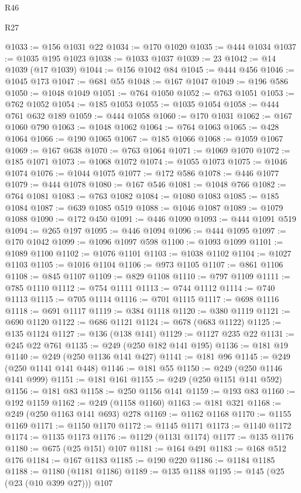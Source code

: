 \begin{lexlean}{R46}
\begin{lexlean}{R27}
\begin{coremodule}
{{{{{{{{{{{{{{{{{{{{{{{{{{{{{{{{{{{{{{{{{{{{{{{{{{{{{{{{{{{{{{@1033 := @156 @1031 @22
@1034 := @170 @1020
@1035 := @444 @1034
@1037 := @1035 @195 @1023
@1038 := @1033 @1037
@1039 := 23
@1042 := @14 @1039 (@17 @1039)
@1044 := @156 @1042 @84
@1045 := @444 @456
@1046 := @1045 @173
@1047 := @681 @55
@1048 := @167 @1047
@1049 := @196 @586
@1050 := @1048 @1049
@1051 := @764 @1050
@1052 := @763 @1051
@1053 := @762 @1052
@1054 := @185 @1053
@1055 := @1035 @1054
@1058 := @444 @761 @632 @189
@1059 := @444 @1058
@1060 := @170 @1031
@1062 := @167 @1060 @790
@1063 := @1048 @1062
@1064 := @764 @1063
@1065 := @428 @1064
@1066 := @190 @1065
@1067 := @185 @1066
@1068 := @1059 @1067
@1069 := @167 @638
@1070 := @763 @1064
@1071 := @1069 @1070
@1072 := @185 @1071
@1073 := @1068 @1072
@1074 := @1055 @1073
@1075 := @1046 @1074
@1076 := @1044 @1075
@1077 := @172 @586
@1078 := @446 @1077
@1079 := @444 @1078
@1080 := @167 @546
@1081 := @1048 @766
@1082 := @764 @1081
@1083 := @763 @1082
@1084 := @1080 @1083
@1085 := @185 @1084
@1087 := @639 @1085 @519
@1088 := @1046 @1087
@1089 := @1079 @1088
@1090 := @172 @450
@1091 := @446 @1090
@1093 := @444 @1091 @519
@1094 := @265 @197
@1095 := @446 @1094
@1096 := @444 @1095
@1097 := @170 @1042
@1099 := @1096 @1097 @598
@1100 := @1093 @1099
@1101 := @1089 @1100
@1102 := @1076 @1101
@1103 := @1038 @1102
@1104 := @1027 @1103
@1105 := @1016 @1104
@1106 := @973 @1105
@1107 := @861 @1106
@1108 := @845 @1107
@1109 := @829 @1108
@1110 := @797 @1109
@1111 := @785 @1110
@1112 := @754 @1111
@1113 := @744 @1112
@1114 := @740 @1113
@1115 := @705 @1114
@1116 := @701 @1115
@1117 := @698 @1116
@1118 := @691 @1117
@1119 := @384 @1118
@1120 := @380 @1119
@1121 := @690 @1120
@1122 := @686 @1121
@1124 := @678 (@683 @1122)
@1125 := @135 @1124
@1127 := @136 (@138 @141)
@1129 := @1127 @235 @22
@1131 := @245 @22 @761
@1135 := @249 (@250 @182 @141 @195)
@1136 := @181 @19
@1140 := @249 (@250 @1136 @141 @427)
@1141 := @181 @96
@1145 := @249 (@250 @1141 @141 @448)
@1146 := @181 @55
@1150 := @249 (@250 @1146 @141 @999)
@1151 := @181 @161
@1155 := @249 (@250 @1151 @141 @592)
@1156 := @181 @83
@1158 := @250 @1156 @141
@1159 := @193 @83
@1160 := @192 @1159
@1162 := @249 (@1158 @1160)
@1163 := @181 @321
@1168 := @249 (@250 @1163 @141 @693) @278
@1169 := @1162 @1168
@1170 := @1155 @1169
@1171 := @1150 @1170
@1172 := @1145 @1171
@1173 := @1140 @1172
@1174 := @1135 @1173
@1176 := @1129 (@1131 @1174)
@1177 := @135 @1176
@1180 := @675 (@25 @151) @107
@1181 := @164 @491
@1183 := @168 @512 @176
@1184 := @167 @1183
@1185 := @190 @220
@1186 := @1184 @1185
@1188 := @1180 (@1181 @1186)
@1189 := @135 @1188
@1195 := @145 (@25 (@23 (@10 @399 @27))) @107
}}}}}}}}}}}}}}}}}}}}}}}}}}}}}}}}}}}}}}}}}}}}}}}}}}}}}}}}}}}}}}
\end{coremodule}
\end{lexlean}
\end{lexlean}
